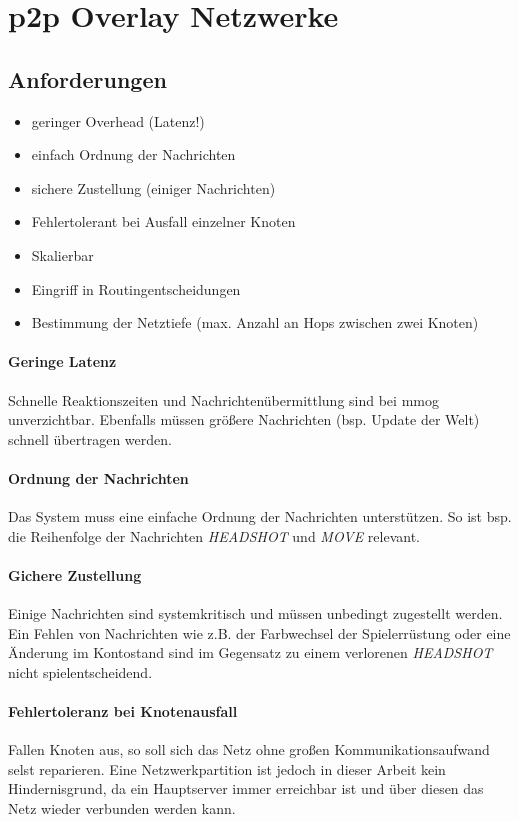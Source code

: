 \section{p2p Overlay Netzwerke}
\label{chap:grundlagen:overlay}

\subsection{Anforderungen}
\begin{itemize}
\item geringer Overhead (Latenz!)
\item einfach Ordnung der Nachrichten
\item sichere Zustellung (einiger Nachrichten)
\item Fehlertolerant bei Ausfall einzelner Knoten
\item Skalierbar
\item Eingriff in Routingentscheidungen
\item Bestimmung der Netztiefe (max. Anzahl an Hops zwischen zwei Knoten)



\end{itemize}

\paragraph{Geringe Latenz} Schnelle Reaktionszeiten und Nachrichtenübermittlung sind bei \ac{mmog} unverzichtbar. Ebenfalls müssen größere Nachrichten (bsp. Update der Welt) schnell übertragen werden.

\paragraph{Ordnung der Nachrichten} Das System muss eine einfache Ordnung der Nachrichten unterstützen. So ist bsp. die Reihenfolge der Nachrichten \emph{HEADSHOT} und \emph{MOVE} relevant.

\paragraph{Gichere Zustellung} Einige Nachrichten sind systemkritisch und müssen unbedingt zugestellt werden. Ein Fehlen von Nachrichten wie z.B. der Farbwechsel der Spielerrüstung oder eine Änderung im Kontostand sind im Gegensatz zu einem verlorenen \emph{HEADSHOT} nicht spielentscheidend. 

\paragraph{Fehlertoleranz bei Knotenausfall} Fallen Knoten aus, so soll sich das Netz ohne großen Kommunikationsaufwand selst reparieren. Eine Netzwerkpartition ist jedoch in dieser Arbeit kein Hindernisgrund, da ein Hauptserver immer erreichbar ist und über diesen das Netz wieder verbunden werden kann.

